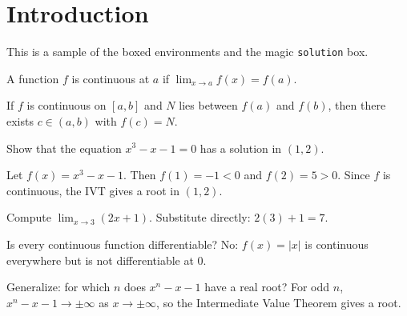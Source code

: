 \documentclass[
	unit   = Lecture,
	number = 1,
	title  = Sample Lecture,
]{didactic}
\begin{document}
\maketitle

\section{Introduction}

This is a sample of the boxed environments and the magic
\texttt{solution} box.

\begin{definition}[Continuity]
	A function $f$ is continuous at $a$ if
	$\lim_{x \to a} f(x) = f(a)$.
\end{definition}

\begin{theorem}
	If $f$ is continuous on $[a,b]$ and $N$ lies between $f(a)$
	and $f(b)$, then there exists $c \in (a,b)$ with $f(c) = N$.
\end{theorem}

%
\begin{exercise}
	Show that the equation $x^3 - x - 1 = 0$ has a solution in
	$(1, 2)$.
\end{exercise}

\begin{solution}[2.5in]
	Let $f(x) = x^3 - x - 1$. Then $f(1) = -1 < 0$ and
	$f(2) = 5 > 0$. Since $f$ is continuous, the IVT gives a
	root in $(1, 2)$.
\end{solution}

\begin{example}
	Compute $\displaystyle \lim_{x \to 3} (2x + 1)$.
	\solution Substitute directly: $2(3) + 1 = 7$.
\end{example}

\begin{question}
	Is every continuous function differentiable?
	\answer No: $f(x) = |x|$ is continuous everywhere but is not
	differentiable at $0$.
\end{question}

\begin{challenge}
	Generalize: for which $n$ does $x^n - x - 1$ have a real root?
	\pf For odd $n$, $x^n - x - 1 \to \pm\infty$ as $x \to \pm\infty$,
	so the Intermediate Value Theorem gives a root.
\end{challenge}
\end{document}
